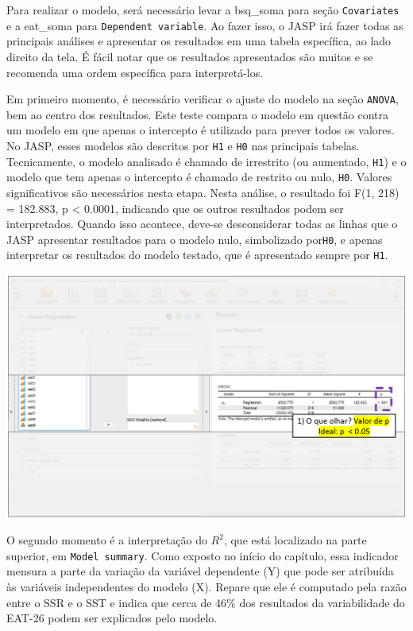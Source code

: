 \documentclass[
]{book}
\begin{document}
Para realizar o modelo, será necessário levar a bsq\_soma para seção
\texttt{Covariates} e a eat\_soma para \texttt{Dependent\ variable}. Ao
fazer isso, o JASP irá fazer todas as principais análises e apresentar
os resultados em uma tabela específica, ao lado direito da tela. É fácil
notar que os resultados apresentados são muitos e se recomenda uma ordem
específica para interpretá-los.

Em primeiro momento, é necessário verificar o ajuste do modelo na seção
\texttt{ANOVA}, bem ao centro dos resultados. Este teste compara o
modelo em questão contra um modelo em que apenas o intercepto é
utilizado para prever todos os valores. No JASP, esses modelos são
descritos por \texttt{H1} e \texttt{H0} nas principais tabelas.
Tecnicamente, o modelo analisado é chamado de irrestrito (ou aumentado,
\texttt{H1}) e o modelo que tem apenas o intercepto é chamado de
restrito ou nulo, \texttt{H0}. Valores significativos são necessários
nesta etapa. Nesta análise, o resultado foi F(1, 218) = 182.883, p
\textless{} 0.0001, indicando que os outros resultados podem ser
interpretados. Quando isso acontece, deve-se desconsiderar todas as
linhas que o JASP apresentar resultados para o modelo nulo, simbolizado
por\texttt{H0}, e apenas interpretar os resultados do modelo testado,
que é apresentado sempre por \texttt{H1}.

\includegraphics{./img/cap_reg_resultados1.png}

O segundo momento é a interpretação do \(R^2\), que está localizado na
parte superior, em \texttt{Model\ summary}. Como exposto no início do
capítulo, essa indicador mensura a parte da variação da variável
dependente (Y) que pode ser atribuída às variáveis independentes do
modelo (X). Repare que ele é computado pela razão entre o SSR e o SST e
indica que cerca de 46\% dos resultados da variabilidade do EAT-26 podem
ser explicados pelo modelo.
\end{document}
